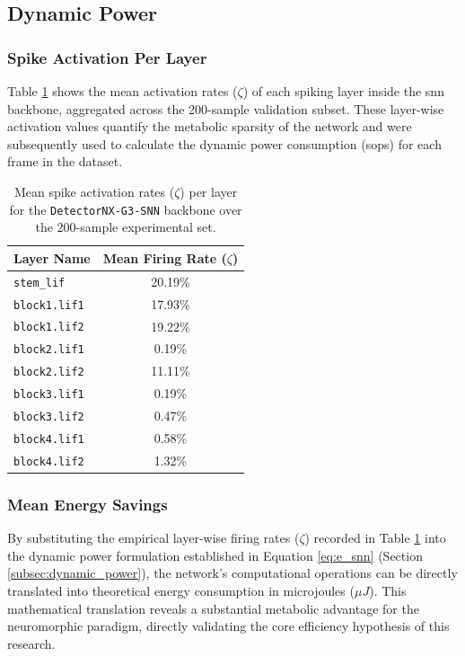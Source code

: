 \subsection{Dynamic Power}

\subsubsection*{Spike Activation Per Layer}

Table \ref{tab:spike_activation} shows the mean activation rates ($\zeta$) of each spiking layer inside the \gls{snn} backbone, aggregated across the 200-sample validation subset. 
These layer-wise activation values quantify the metabolic sparsity of the network and were subsequently used to calculate the dynamic power consumption (\glspl{sop}) for each frame in the dataset.

\begin{table}[htbp]
\centering
\begin{tabular}{|l|c|}
\hline
\textbf{Layer Name} & \textbf{Mean Firing Rate ($\zeta$)} \\
\hline
\texttt{stem\_lif} & 20.19\% \\
\texttt{block1.lif1} & 17.93\% \\
\texttt{block1.lif2} & 19.22\% \\
\texttt{block2.lif1} & 0.19\% \\
\texttt{block2.lif2} & 11.11\% \\
\texttt{block3.lif1} & 0.19\% \\
\texttt{block3.lif2} & 0.47\% \\
\texttt{block4.lif1} & 0.58\% \\
\texttt{block4.lif2} & 1.32\% \\
\hline
\end{tabular}
\caption[Layer-Wise Spike Activation Rates]{Mean spike activation rates ($\zeta$) per layer for the \texttt{DetectorNX-G3-SNN} backbone over the 200-sample experimental set.}
\label{tab:spike_activation}
\end{table}

\subsubsection*{Mean Energy Savings}
\label{subsubsec:mean_energy_savings}

By substituting the empirical layer-wise firing rates ($\zeta$) recorded in Table \ref{tab:spike_activation} into the dynamic power formulation established in Equation \ref{eq:e_snn} (Section \ref{subsec:dynamic_power}), the network's computational operations can be directly translated into theoretical energy consumption in microjoules ($\mu J$). This mathematical translation reveals a substantial metabolic advantage for the neuromorphic paradigm, directly validating the core efficiency hypothesis of this research.

